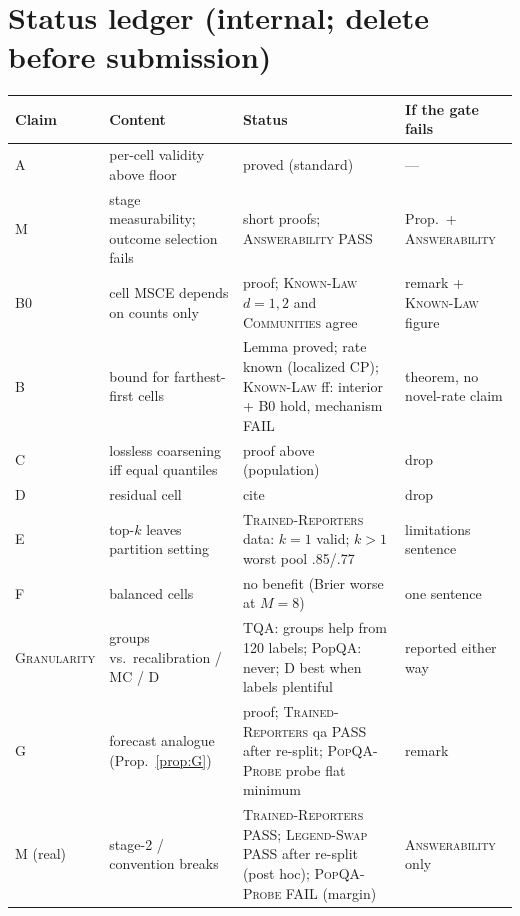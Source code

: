\documentclass[11pt]{article}
\newif\ifdraft \drafttrue
\theoremstyle{definition}
\theoremstyle{remark}
\newcommand{\1}{\mathbf{1}}
\newcommand{\expname}[1]{\textsc{#1}}
\begin{document}

\ifdraft
\section{Status ledger (internal; delete before submission)}
\begin{center}\small
\begin{tabular}{llll}
\toprule
Claim & Content & Status & If the gate fails\\
\midrule
A  & per-cell validity above floor & proved (standard) & --- \\
M  & stage measurability; outcome selection fails & short proofs; \expname{Answerability} PASS & Prop.\ + \expname{Answerability} \\
B0 & cell MSCE depends on counts only & proof; \expname{Known-Law} $d{=}1,2$ and \expname{Communities} agree & remark + \expname{Known-Law} figure \\
B  & bound for farthest-first cells & Lemma proved; rate known (localized CP); \expname{Known-Law} ff: interior + B0 hold, mechanism FAIL & theorem, no novel-rate claim\\
C  & lossless coarsening iff equal quantiles & proof above (population) & drop \\
D  & residual cell & cite & drop \\
E  & top-$k$ leaves partition setting & \expname{Trained-Reporters} data: $k{=}1$ valid; $k{>}1$ worst pool .85/.77 & limitations sentence \\
F  & balanced cells & no benefit (Brier worse at $M{=}8$) & one sentence \\
\expname{Granularity} & groups vs.\ recalibration / MC / D & TQA: groups help from 120 labels; PopQA: never; D best when labels plentiful & reported either way\\
G  & forecast analogue (Prop.~\ref{prop:G}) & proof; \expname{Trained-Reporters} qa PASS after re-split; \expname{PopQA-Probe} probe flat minimum & remark \\
M (real) & stage-2 / convention breaks & \expname{Trained-Reporters} PASS; \expname{Legend-Swap} PASS after re-split (post hoc); \expname{PopQA-Probe} FAIL (margin) & \expname{Answerability} only \\
\bottomrule
\end{tabular}
\end{center}
\end{document}
